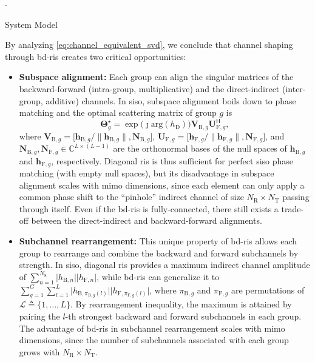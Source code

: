 \begin{section}{-}
\begin{subsection}{System Model}
		\begin{remark}\label{rm:channel_shaping}
			By analyzing \eqref{eq:channel_equivalent_svd}, we conclude that channel shaping through \gls{bd}-\gls{ris} creates two critical opportunities:
			\begin{itemize}
				\item \textbf{Subspace alignment:} Each group can align the singular matrices of the backward-forward (intra-group, multiplicative) and the direct-indirect (inter-group, additive) channels. In \gls{siso}, subspace alignment boils down to phase matching and the optimal scattering matrix of group $g$ is
				\begin{equation}
					\mathbf{\Theta}_g^\star = \exp \bigl(\jmath \mathrm{arg}(h_\mathrm{D})\bigr) \mathbf{V}_{\mathrm{B},g} \mathbf{U}_{\mathrm{F},g}^\mathsf{H},
				\end{equation}
				where $\mathbf{V}_{\mathrm{B},g} = \bigl[\mathbf{h}_{\mathrm{B},g}/\lVert \mathbf{h}_{\mathrm{B},g} \rVert, \mathbf{N}_{\mathrm{B},g}\bigr]$, $\mathbf{U}_{\mathrm{F},g} = \bigl[\mathbf{h}_{\mathrm{F},g}/\lVert \mathbf{h}_{\mathrm{F},g} \rVert, \mathbf{N}_{\mathrm{F},g}\bigr]$, and $\mathbf{N}_{\mathrm{B},g}, \mathbf{N}_{\mathrm{F},g} \in \mathbb{C}^{L \times (L-1)}$ are the orthonormal bases of the null spaces of $\mathbf{h}_{\mathrm{B},g}$ and $\mathbf{h}_{\mathrm{F},g}$, respectively.
				Diagonal \gls{ris} is thus sufficient for perfect \gls{siso} phase matching (with empty null spaces), but its disadvantage in subspace alignment scales with \gls{mimo} dimensions, since each element can only apply a common phase shift to the ``pinhole'' indirect channel of size $N_\mathrm{R} \times N_\mathrm{T}$ passing through itself.
				Even if the \gls{bd}-\gls{ris} is fully-connected, there still exists a trade-off between the direct-indirect and backward-forward alignments.
				\item \textbf{Subchannel rearrangement:} This unique property of \gls{bd}-\gls{ris} allows each group to rearrange and combine the backward and forward subchannels by strength. In \gls{siso}, diagonal \gls{ris} provides a maximum indirect channel amplitude of $\sum_{n=1}^{N_\mathrm{S}} \lvert h_{\mathrm{B},n} \rvert \lvert h_{\mathrm{F},n} \rvert$, while \gls{bd}-\gls{ris} can generalize it to $\sum_{g=1}^{G} \sum_{l=1}^{L} \lvert h_{\mathrm{B},\pi_{\mathrm{B},g}(l)} \rvert \lvert h_{\mathrm{F},\pi_{\mathrm{F},g}(l)} \rvert$, where $\pi_{\mathrm{B},g}$ and $\pi_{\mathrm{F},g}$ are permutations of $\mathcal{L} \triangleq \{1, \ldots, L\}$. By rearrangement inequality, the maximum is attained by pairing the $l$-th strongest backward and forward subchannels in each group.
				The advantage of \gls{bd}-\gls{ris} in subchannel rearrangement scales with \gls{mimo} dimensions, since the number of subchannels associated with each group grows with $N_\mathrm{R} \times N_\mathrm{T}$.
			\end{itemize}
		\end{remark}


\end{subsection}
\end{section}

